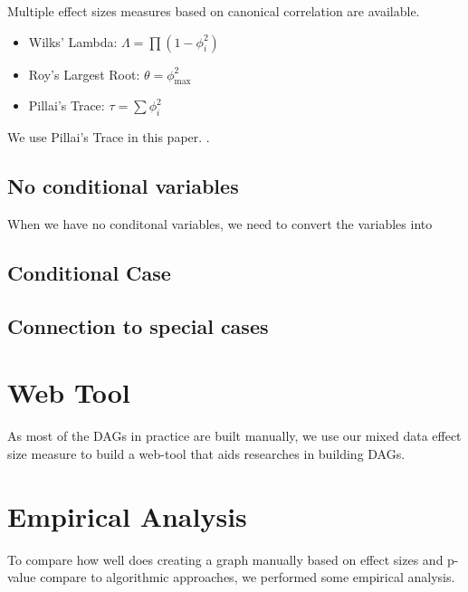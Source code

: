\documentclass[letterpaper]{article} %
\begin{document}
Multiple effect sizes measures based on canonical correlation are available.
\begin{itemize}
	\item Wilks' Lambda: $ \Lambda = \prod (1 - \phi_i^2) $
	\item Roy's Largest Root: $ \theta = \phi_{\max}^2 $
	\item Pillai's Trace: $ \tau = \sum \phi_i^2 $
\end{itemize}
We use Pillai's Trace in this paper. .

\subsection{No conditional variables}
When we have no conditonal variables, we need to convert the variables into 

\subsection{Conditional Case}

\subsection{Connection to special cases}

\section{Web Tool}
As most of the DAGs in practice are built manually, we use our mixed data effect size measure to build a web-tool that aids researches in building DAGs.


\section{Empirical Analysis}
To compare how well does creating a graph manually based on effect sizes and
p-value compare to algorithmic approaches, we performed some empirical
analysis.
\end{document}
